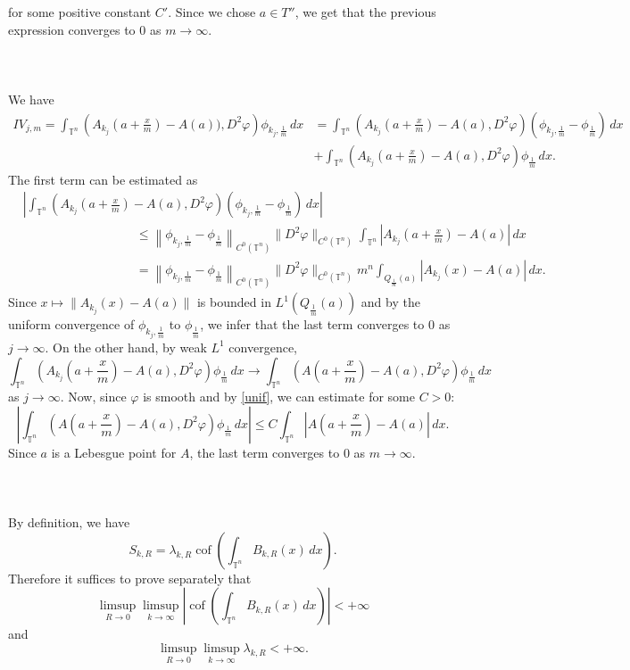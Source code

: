 \documentclass[10pt,reqno]{amsart}
\numberwithin{equation}{section}
\newcommand{\T}{\mathbb{T}}
\DeclareMathOperator{\cof}{cof}
\theoremstyle{plain}
\theoremstyle{definition}
\theoremstyle{remark}
\begin{document}
for some positive constant $C'$. Since we chose $a \in T''$, we get that the previous expression converges to 0 as $m \to \infty$.
\\
\\
\indent{}
\\
\\
We have
\begin{align*}
IV_{j,m} =\int_{\T^n}\left(A_{k_j}\left(a + \frac{x}{m}\right) -A(a)),D^2\varphi\right) \phi_{k_j,\frac1m}\,dx &=\int_{\T^n}\left(A_{k_j}\left(a + \frac{x}{m}\right) -A(a),D^2\varphi\right) \left(\phi_{k_j,\frac1m}- \phi_{\frac1m}\right)\,dx\\
&+ \int_{\T^n}\left(A_{k_j}\left(a + \frac{x}{m}\right) -A(a),D^2\varphi\right) \phi_{\frac1m}\,dx.
\end{align*}
The first term can be estimated as
\begin{align*}
&\left| \int_{\T^n} \left(A_{k_j}\left(a + \frac{x}{m}\right) -A(a),D^2\varphi\right) \left(\phi_{k_j,\frac1m}- \phi_{\frac1m}\right)\,dx\right| \\
&\qquad\qquad\qquad\qquad\quad \leq \left\|\phi_{k_j,\frac1m}- \phi_{\frac1m}\right\|_{C^0(\T^n)}\|D^2\varphi\|_{C^0(\T^n)}\int_{\T^n}\left|A_{k_j}\left(a + \frac{x}{m}\right) - A(a)\right|\,dx \\
&\qquad\qquad\qquad\qquad\quad=\left\|\phi_{k_j,\frac1m}- \phi_{\frac1m}\right\|_{C^0(\T^n)}\|D^2\varphi\|_{C^0(\T^n)}m^n\int_{Q_{\frac1m}(a)}\left|A_{k_j}(x) - A(a)\right|\,dx.
\end{align*}
Since $x\mapsto \|A_{k_j}(x) - A(a)\|$ is bounded in $L^1(Q_{\frac1m}(a))$ and by the uniform convergence of $\phi_{k_j,\frac1m}$ to $\phi_{\frac1m}$, we infer that the last term converges to $0$ as $j \to \infty$. On the other hand, by weak $L^1$ convergence,
\[
\int_{\T^n}\left(A_{k_j}\left(a + \frac{x}{m}\right) -A(a),D^2\varphi\right) \phi_{\frac1m}\,dx \to \int_{\T^n}\left(A\left(a + \frac{x}{m}\right) -A(a),D^2\varphi\right) \phi_{\frac1m}\,dx
\]
as $j \to \infty$. Now, since $\varphi$ is smooth and by \eqref{unif}, we can estimate for some $C > 0$:
\[
\left|\int_{\T^n}\left(A\left(a + \frac{x}{m}\right) -A(a),D^2\varphi\right) \phi_{\frac1m}\,dx\right| \le C\int_{\T^n}\left|A\left(a + \frac{x}{m}\right) - A(a)\right|\,dx.
\]
Since $a$ is a Lebesgue point for $A$, the last term converges to $0$ as $m\to \infty$.
\\
\\
\indent{}
\\
\\
By definition, we have 
\[
S_{k,R} = \lambda_{k,R}\cof\left(\int_{\T^n}B_{k,R}(x)\,dx\right).
\]
Therefore it suffices to prove separately that
\begin{equation}\label{imp1}
\limsup_{R\to 0}\limsup_{k\to \infty}\left|\cof\left(\int_{\T^n}B_{k,R}(x)\,dx\right)\right| < +\infty
\end{equation}
and
\begin{equation}\label{imp2}
\limsup_{R\to 0}\limsup_{k\to \infty}\lambda_{k,R} < +\infty.
\end{equation}
\end{document}
